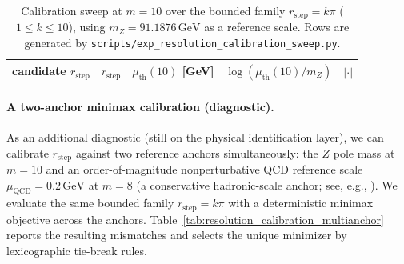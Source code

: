 \begin{table}[t]
\centering
\scriptsize
\setlength{\tabcolsep}{6pt}
\renewcommand{\arraystretch}{1.15}
\begin{tabular}{lrrrr}
\toprule
candidate $r_{\mathrm{step}}$ & $r_{\mathrm{step}}$ & $\mu_{\mathrm{th}}(10)$ [GeV] & $\log(\mu_{\mathrm{th}}(10)/m_Z)$ & $|\cdot|$ \\
\midrule
%
\end{tabular}
\caption{Calibration sweep at $m=10$ over the bounded family $r_{\mathrm{step}}=k\pi$ ($1\le k\le 10$), using $m_Z=91.1876\,\mathrm{GeV}$ as a reference scale. Rows are generated by \texttt{scripts/exp\_resolution\_calibration\_sweep.py}.}
\label{tab:resolution_calibration_sweep}
\end{table}

\paragraph{A two-anchor minimax calibration (diagnostic).}
As an additional diagnostic (still on the physical identification layer), we can calibrate $r_{\mathrm{step}}$ against two reference anchors simultaneously: the $Z$ pole mass at $m=10$ and an order-of-magnitude nonperturbative QCD reference scale $\mu_{\mathrm{QCD}}=0.2\,\mathrm{GeV}$ at $m=8$ (a conservative hadronic-scale anchor; see, e.g., \cite{PDGRPP2024}).
We evaluate the same bounded family $r_{\mathrm{step}}=k\pi$ with a deterministic minimax objective across the anchors.
Table~\ref{tab:resolution_calibration_multianchor} reports the resulting mismatches and selects the unique minimizer by lexicographic tie-break rules.

\begin{table}[t]
\centering
\scriptsize
\setlength{\tabcolsep}{6pt}
\renewcommand{\arraystretch}{1.15}
%
\caption{Two-anchor minimax calibration over the bounded family $r_{\mathrm{step}}=k\pi$ ($1\le k\le 10$), using $m_Z=91.1876\,\mathrm{GeV}$ and $\mu_{\mathrm{QCD}}=0.2\,\mathrm{GeV}$ as reference anchors at $m=10$ and $m=8$, respectively. Rows are generated by \texttt{scripts/exp\_resolution\_calibration\_multianchor.py}.}
\label{tab:resolution_calibration_multianchor}
\end{table}

